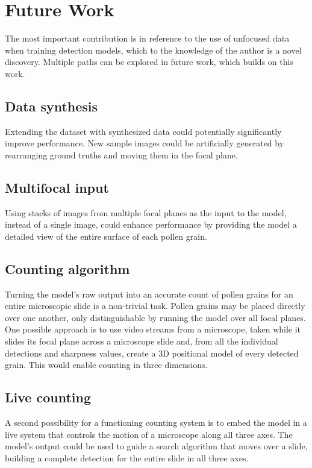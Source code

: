 \section{Future Work}
The most important contribution is in reference to the use of unfocused data when training detection models, which to the knowledge of the author is a novel discovery.
Multiple paths can be explored in future work, which builds on this work.

\subsection*{Data synthesis}
Extending the dataset with synthesized data could potentially significantly improve performance.
New sample images could be artificially generated by rearranging ground truths and moving them in the focal plane.

\subsection*{Multifocal input}
Using stacks of images from multiple focal planes as the input to the model, instead of a single image, could enhance performance by providing the model a detailed view of the entire surface of each pollen grain.

\subsection*{Counting algorithm}
Turning the model's raw output into an accurate count of pollen grains for an entire microscopic slide is a non-trivial task.
Pollen grains may be placed directly over one another, only distinguishable by running the model over all focal planes.
One possible approach is to use video streams from a microscope, taken while it slides its focal plane across a microscope slide and, from all the individual detections and sharpness values, create a 3D positional model of every detected grain.
This would enable counting in three dimensions.

\subsection*{Live counting}
A second possibility for a functioning counting system is to embed the model in a live system that controls the motion of a microscope along all three axes.
The model's output could be used to guide a search algorithm that moves over a slide, building a complete detection for the entire slide in all three axes.
